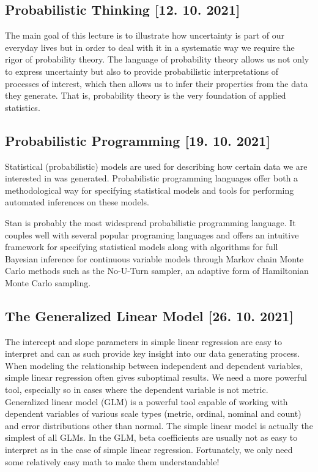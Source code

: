 \documentclass[fleqn,moreauthors,10pt]{ds_report}
\begin{document}
\subsection*{Probabilistic Thinking [12. 10. 2021]}

The main goal of this lecture is to illustrate how uncertainty is part of our everyday lives but in order to deal with it in a systematic way we require the rigor of probability theory. The language of probability theory allows us not only to express uncertainty but also to provide probabilistic interpretations of processes of interest, which then allows us to infer their properties from the data they generate. That is, probability theory is the very foundation of applied statistics.

\subsection*{Probabilistic Programming [19. 10. 2021]}

Statistical (probabilistic) models are used for describing how certain data we are interested in was generated. Probabilistic programming languages offer both a methodological way for specifying statistical models and tools for performing automated inferences on these models.

Stan is probably the most widespread probabilistic programming language. It couples well with several popular programing languages and offers an intuitive framework for specifying statistical models along with algorithms for full Bayesian inference for continuous variable models through Markov chain Monte Carlo methods such as the No-U-Turn sampler, an adaptive form of Hamiltonian Monte Carlo sampling.

\subsection*{The Generalized Linear Model [26. 10. 2021]}

The intercept and slope parameters in simple linear regression are easy to interpret and can as such provide key insight into our data generating process. When modeling the relationship between independent and dependent variables, simple linear regression often gives suboptimal results. We need a more powerful tool, especially so in cases where the dependent variable is not metric. Generalized linear model (GLM) is a powerful tool capable of working with dependent variables of various scale types (metric, ordinal, nominal and count) and error distributions other than normal. The simple linear model is actually the simplest of all GLMs. In the GLM, beta coefficients are usually not as easy to interpret as in the case of simple linear regression. Fortunately, we only need some relatively easy math to make them understandable!
\end{document}
